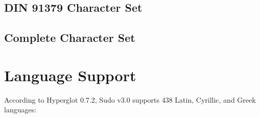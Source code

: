 \documentclass[paper=a4, 12pt]{scrbook}
\begin{document}
\section{DIN 91379 Character Set}


\section{Complete Character Set}



\chapter{Language Support}\label{languages}

According to Hyperglot 0.7.2, Sudo v3.0 supports 438 Latin, Cyrillic, and Greek languages:
\end{document}
